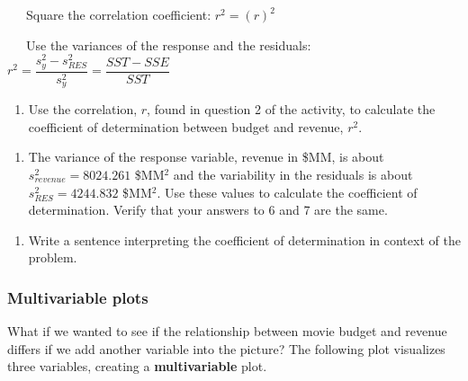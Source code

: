 \documentclass[
]{report}
\providecommand{\tightlist}{%
  \setlength{\itemsep}{0pt}\setlength{\parskip}{0pt}}
\begin{document}
~~~Square the correlation coefficient: \(r^2 = (r)^2\)

~~~Use the variances of the response and the residuals: \(r^2 = \dfrac{s_y^2 - s_{RES}^2}{s_y^2} = \dfrac{SST - SSE}{SST}\)

\begin{enumerate}
\def\labelenumi{\arabic{enumi}.}
\setcounter{enumi}{5}
\tightlist
\item
  Use the correlation, \(r\), found in question 2 of the activity, to calculate the coefficient of determination between budget and revenue, \(r^2\).
\end{enumerate}

\vspace{.4in}

\begin{enumerate}
\def\labelenumi{\arabic{enumi}.}
\setcounter{enumi}{6}
\tightlist
\item
  The variance of the response variable, revenue in \$MM, is about \(s_{revenue}^2 = 8024.261\) \$MM\(^2\) and the variability in the residuals is about \(s_{RES}^2 = 4244.832\) \$MM\(^2\). Use these values to calculate the coefficient of determination. Verify that your answers to 6 and 7 are the same.
\end{enumerate}

\vspace{1in}

\begin{enumerate}
\def\labelenumi{\arabic{enumi}.}
\setcounter{enumi}{7}
\tightlist
\item
  Write a sentence interpreting the coefficient of determination in context of the problem.
\end{enumerate}

\vspace{1in}

\hypertarget{multivariable-plots}{%
\subsubsection*{Multivariable plots}\label{multivariable-plots}}

What if we wanted to see if the relationship between movie budget and revenue differs if we add another variable into the picture? The following plot visualizes three variables, creating a \textbf{multivariable} plot.
\end{document}
